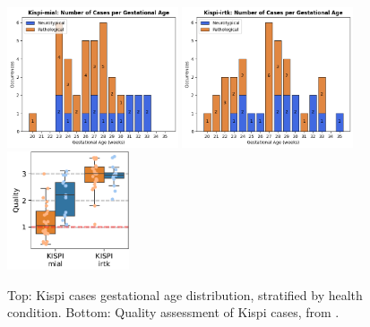 \begin{figure}[hbt]
    \centering
    \includegraphics[width=0.45\textwidth]{figures/k-mial_GA.png} \quad
    \includegraphics[width=0.45\textwidth]{figures/k-irtk_GA.png}\\
    \vspace{10pt}
    \includegraphics[width=0.32\textwidth]{figures/kispi_quality.png}
    \caption{Top: Kispi cases gestational age distribution, stratified by health condition. Bottom: Quality assessment of Kispi cases, from \cite{FeTA2024_review}.}
    \label{fig:kispi_plots}
\end{figure}

